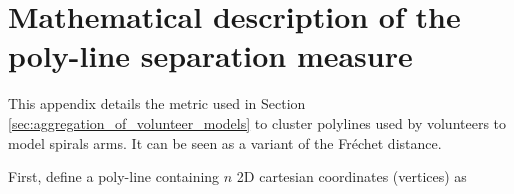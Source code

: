 \documentclass[../main.tex]{subfiles}
\begin{document}
%
%
%
%

\section{Mathematical description of the poly-line separation measure}
\label{appendix:clusteringMaths}

This appendix details the metric used in Section \ref{sec:aggregation_of_volunteer_models} to cluster poly\-lines used by volunteers to model spirals arms. It can be seen as a variant of the Fréchet distance.

First, define a poly-line containing $n$ 2D cartesian coordinates (vertices) as
\end{document}
